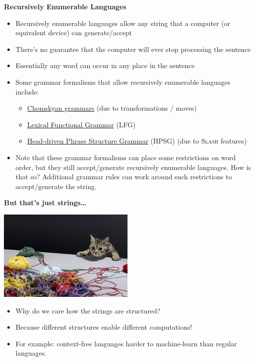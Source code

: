 \documentclass{beamer}
\newcommand{\pagestepalt}[2]{
  \begin{frame}[t]
    \begin{minipage}[t][0.26\textheight][t]{\textwidth}
      \begin{center}
        \huge
        \textbf{#1}
      \end{center}
    \end{minipage}
    
    \begin{minipage}[t][0.7\textheight][c]{\textwidth}
      #2
    \end{minipage}
  \end{frame}
}
\begin{document}
\pagestepalt{Recursively Enumerable Languages}{
\begin{itemize}
	\item Recursively enumerable languages allow any string that a computer (or equivalent device) can generate/accept
	\item There's no guarantee that the computer will ever stop processing the sentence
	\item Essentially any word can occur in any place in the sentence
	\pause
	\item Some grammar formalisms that allow recursively enumerable languages include:
	\begin{itemize}
		\item \href{https://en.wikipedia.org/wiki/Transformational_grammar}{Chomskyan grammars} (due to transformations / moves)
		\item \href{https://en.wikipedia.org/wiki/Lexical_functional_grammar}{Lexical Functional Grammar} (LFG)
		\item \href{https://en.wikipedia.org/wiki/Head-driven_phrase_structure_grammar}{Head-driven Phrase Structure Grammar} (HPSG) (due to \textsc{Slash} features)
	\end{itemize}
	\pause
	\item Note that these grammar formalisms can place some restrictions on word order, but they still accept/generate recursively enumerable languages. \pause How is that so? \pause Additional grammar rules can work around such restrictions to accept/generate the string.
\end{itemize}
}

\pagestepalt{But that's just strings\ldots}{
  \vspace{-1cm}
  \begin{center}
    \href{http://science.howstuffworks.com/science-vs-myth/everyday-myths/string-theory.htm}{\includegraphics[width=0.5\textwidth]{../images/string-theory.jpg}}
  \end{center}\pause
  \begin{itemize}
  \item Why do we care how the strings are structured?\pause
  \item Because different structures enable different computations!\pause
  \item For example: context-free languages harder to machine-learn than regular languages.
  \end{itemize}
}
\end{document}
